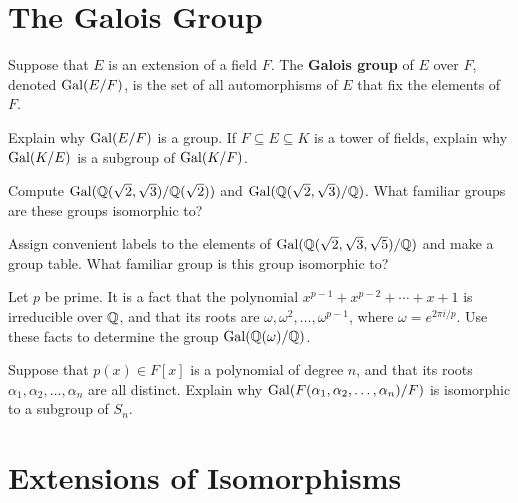 \section{The Galois Group}

\begin{definition}
    Suppose that $E$ is an extension of a field $F$. The \textbf{Galois group} of $E$ over $F$, denoted $\operatorname{Gal}(E/F)$, is the set of all automorphisms of $E$ that fix the elements of $F$.
\end{definition}

\begin{problem}
    Explain why $\operatorname{Gal}(E/F)$ is a group. If $F\subseteq E\subseteq K$ is a tower of fields, explain why $\operatorname{Gal}(K/E)$ is a subgroup of $\operatorname{Gal}(K/F)$.
\end{problem}

\begin{problem}
    Compute $\operatorname{Gal}(\mathbb{Q}(\sqrt{2},\sqrt{3})/\mathbb{Q}(\sqrt{2}))$ and $\operatorname{Gal}(\mathbb{Q}(\sqrt{2},\sqrt{3})/\mathbb{Q})$. What familiar groups are these groups isomorphic to?
\end{problem}

\begin{problem}
    Assign convenient labels to the elements of $\operatorname{Gal}(\mathbb{Q}(\sqrt{2},\sqrt{3},\sqrt{5})/\mathbb{Q})$ and make a group table. What familiar group is this group isomorphic to?
\end{problem}

\begin{problem}
    Let $p$ be prime. It is a fact that the polynomial $x^{p-1}+x^{p-2}+\cdots+x+1$ is irreducible over $\mathbb{Q}$, and that its roots are $\omega,\omega^2,\ldots,\omega^{p-1}$, where $\omega = e^{2\pi i/p}$. Use these facts to determine the group $\operatorname{Gal}(\mathbb{Q}(\omega)/\mathbb{Q})$.
\end{problem}

\begin{problem}\label{prob:galsubsn}
    Suppose that $p(x)\in F[x]$ is a polynomial of degree $n$, and that its roots $\alpha_1,\alpha_2,\ldots,\alpha_n$ are all distinct. Explain why $\operatorname{Gal}(F(\alpha_1,\alpha_2,\ldots,\alpha_n)/F)$ is isomorphic to a subgroup of $S_n$.
\begin{annotation}
\end{annotation}
\end{problem}

\section{Extensions of Isomorphisms}

